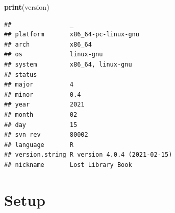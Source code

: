 \documentclass[]{book}
\newenvironment{Shaded}{\begin{snugshade}}{\end{snugshade}}
\newcommand{\KeywordTok}[1]{\textcolor[rgb]{0.13,0.29,0.53}{\textbf{#1}}}
\newcommand{\NormalTok}[1]{#1}
\begin{document}
\begin{Shaded}
\begin{Highlighting}[]
\KeywordTok{print}\NormalTok{(version)}
\end{Highlighting}
\end{Shaded}

\begin{verbatim}
##                _                           
## platform       x86_64-pc-linux-gnu         
## arch           x86_64                      
## os             linux-gnu                   
## system         x86_64, linux-gnu           
## status                                     
## major          4                           
## minor          0.4                         
## year           2021                        
## month          02                          
## day            15                          
## svn rev        80002                       
## language       R                           
## version.string R version 4.0.4 (2021-02-15)
## nickname       Lost Library Book
\end{verbatim}

\hypertarget{setup-2}{%
\section{Setup}\label{setup-2}}
\end{document}
